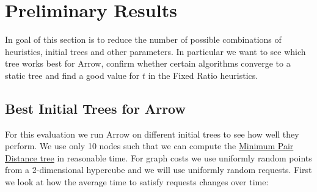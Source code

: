 \documentclass[a4paper, oneside]{discothesis}
\begin{document}
\newcommand{\evalTime}{Average request time $\mathcal{C}_{time}$}
\newcommand{\evalHops}{Average request hops $\mathcal{C}_{hops}$}
\newcommand{\evalEdges}{Average tree edge distance $\mathcal{C}_{edges}$}


\section{Preliminary Results}

In goal of this section is to reduce the number of possible combinations of heuristics, initial trees and other parameters. In particular we want to see which tree works best for Arrow, confirm whether certain algorithms converge to a static tree and find a good value for $t$ in the Fixed Ratio heuristics.

\subsection{Best Initial Trees for Arrow}\label{result:trees}

For this evaluation we run Arrow on different initial trees to see how well they perform. We use only 10 nodes such that we can compute the \hyperref[tree:mpd]{Minimum Pair Distance tree} in reasonable time. For graph costs we use uniformly random points from a 2-dimensional hypercube and we will use uniformly random requests. First we look at how the average time to satisfy requests changes over time:

\end{document}

